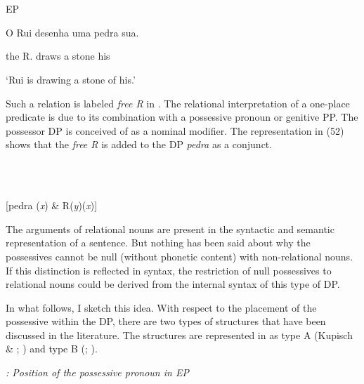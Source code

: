 \documentclass[output=paper]{langsci/langscibook}
\begin{document}
\ea%
    \label{ex:key:51}
    \gll\\
        \\
    \glt
    \z

          EP  

O Rui desenha uma pedra sua.

the R. draws a stone his

‘Rui is drawing a stone of his.’

Such a relation is labeled \textit{free R} in \citet{Partee1997}. The relational interpretation of a one-place predicate is due to its combination with a possessive pronoun or genitive PP. The possessor DP is conceived of as a nominal modifier. The representation in (52) shows that the \textit{free R} is added to the DP \textit{pedra} as a conjunct.

\ea%
    \label{ex:key:52}
    \gll\\
        \\
    \glt
    \z

          [pedra (\textit{x}) \& R(\textit{y})(\textit{x})]

The arguments of relational nouns are present in the syntactic and semantic representation of a sentence. But nothing has been said about why the possessives cannot be null (without phonetic content) with non-relational nouns. If this distinction is reflected in syntax, the restriction of null possessives to relational nouns could be derived from the internal syntax of this type of DP.

In what follows, I sketch this idea. With respect to the placement of the possessive within the DP, there are two types of structures that have been discussed in the literature. The structures are represented in  as type A (Kupisch \& \citealt{Rinke2011}; \citealt{Alexiadou2005}) and type B (\citealt{Parodi1994}; \citealt{Brito2007}).

  
 

\textit{: Position of the possessive pronoun in EP}
\end{document}
